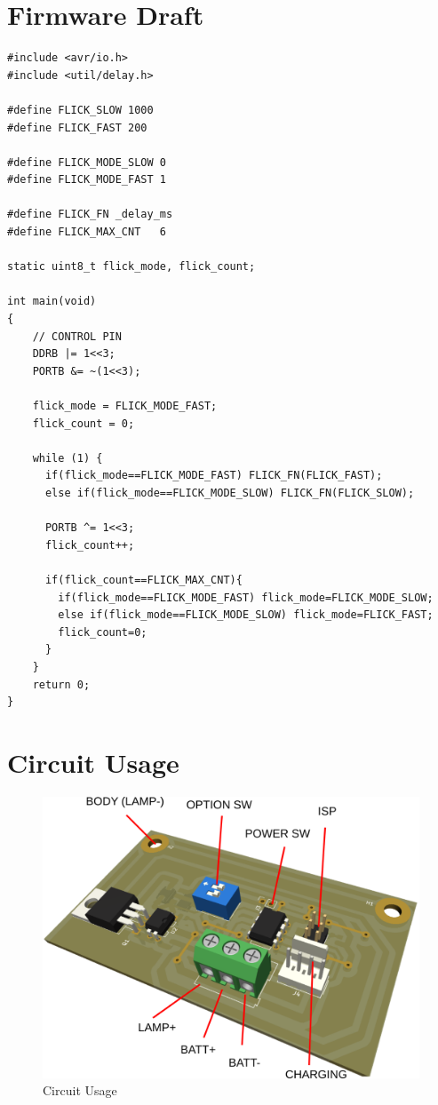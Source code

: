 \documentclass[a4paper,12pt,oneside,pdflatex,italian,final,twocolumn]{article}
\begin{document}
	\raggedright
	
	\section{Firmware Draft}
	
	\begin{verbatim}
#include <avr/io.h>
#include <util/delay.h>

#define FLICK_SLOW 1000
#define FLICK_FAST 200

#define FLICK_MODE_SLOW 0
#define FLICK_MODE_FAST 1

#define FLICK_FN _delay_ms
#define FLICK_MAX_CNT   6

static uint8_t flick_mode, flick_count;

int main(void)
{
	// CONTROL PIN
	DDRB |= 1<<3;
	PORTB &= ~(1<<3);
	
	flick_mode = FLICK_MODE_FAST;
	flick_count = 0;
	
	while (1) {
	  if(flick_mode==FLICK_MODE_FAST) FLICK_FN(FLICK_FAST);
	  else if(flick_mode==FLICK_MODE_SLOW) FLICK_FN(FLICK_SLOW);
		
	  PORTB ^= 1<<3;
	  flick_count++;
		
	  if(flick_count==FLICK_MAX_CNT){
	    if(flick_mode==FLICK_MODE_FAST) flick_mode=FLICK_MODE_SLOW;
		else if(flick_mode==FLICK_MODE_SLOW) flick_mode=FLICK_FAST;
		flick_count=0;
	  }
	}
	return 0;
}
	\end{verbatim}
	
	\section{Circuit Usage}

	\begin{figure}[h]
		\centering
		\includegraphics[width=\textwidth]{images/part.png}
		\caption{Circuit Usage}
	\end{figure}
	
\end{document}
